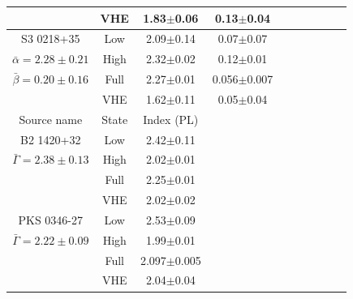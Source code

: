 \documentclass[11pt]{article}
\begin{document}
\begin{table}[htbp]
{\begin{tabular}{|c|c|c|c|c|c|c|c|c|c|}
         & VHE & 1.83$\pm$0.06 & 0.13$\pm$0.04 \\
    \hline
       S3 0218+35 & Low & 2.09$\pm$0.14 &  0.07$\pm$0.07 \\ %
        $\bar{\alpha}=2.28\pm0.21$ & High & 2.32$\pm$0.02 & 0.12$\pm$0.01 \\ %
        $\bar{\beta}=0.20\pm0.16$ & Full & 2.27$\pm$0.01 & 0.056$\pm$0.007 \\ %
         & VHE & 1.62$\pm$0.11 & 0.05$\pm$0.04 \\
    \hline
    \hline
    Source name & State & Index (PL) & \\
    \hline
       B2 1420+32 & Low & 2.42$\pm$0.11 & \\ %
        $\bar{\Gamma}=2.38\pm0.13$ & High & 2.02$\pm$0.01 & \\ %
         & Full & 2.25$\pm$0.01 & \\ %
         & VHE & 2.02$\pm$0.02 & \\
    \hline
       PKS 0346-27 & Low & 2.53$\pm$0.09 & \\ %
        $\bar{\Gamma}=2.22\pm0.09$ & High & 1.99$\pm$0.01 & \\ %
         & Full & 2.097$\pm$0.005 & \\ %
         & VHE & 2.04$\pm$0.04 & \\
    \hline
    \end{tabular}
}
\end{table}
\end{document}
